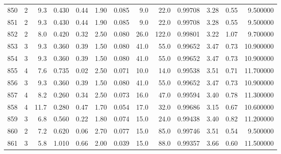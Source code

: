 \begin{tabular}{lrrrrrrrrrrrr}
850  &        2 &            9.3 &             0.430 &         0.44 &            1.90 &      0.085 &                  9.0 &                  22.0 &  0.99708 &  3.28 &       0.55 &   9.500000 \\
851  &        2 &            9.3 &             0.430 &         0.44 &            1.90 &      0.085 &                  9.0 &                  22.0 &  0.99708 &  3.28 &       0.55 &   9.500000 \\
852  &        2 &            8.0 &             0.420 &         0.32 &            2.50 &      0.080 &                 26.0 &                 122.0 &  0.99801 &  3.22 &       1.07 &   9.700000 \\
853  &        3 &            9.3 &             0.360 &         0.39 &            1.50 &      0.080 &                 41.0 &                  55.0 &  0.99652 &  3.47 &       0.73 &  10.900000 \\
854  &        3 &            9.3 &             0.360 &         0.39 &            1.50 &      0.080 &                 41.0 &                  55.0 &  0.99652 &  3.47 &       0.73 &  10.900000 \\
855  &        4 &            7.6 &             0.735 &         0.02 &            2.50 &      0.071 &                 10.0 &                  14.0 &  0.99538 &  3.51 &       0.71 &  11.700000 \\
856  &        3 &            9.3 &             0.360 &         0.39 &            1.50 &      0.080 &                 41.0 &                  55.0 &  0.99652 &  3.47 &       0.73 &  10.900000 \\
857  &        4 &            8.2 &             0.260 &         0.34 &            2.50 &      0.073 &                 16.0 &                  47.0 &  0.99594 &  3.40 &       0.78 &  11.300000 \\
858  &        4 &           11.7 &             0.280 &         0.47 &            1.70 &      0.054 &                 17.0 &                  32.0 &  0.99686 &  3.15 &       0.67 &  10.600000 \\
859  &        3 &            6.8 &             0.560 &         0.22 &            1.80 &      0.074 &                 15.0 &                  24.0 &  0.99438 &  3.40 &       0.82 &  11.200000 \\
860  &        2 &            7.2 &             0.620 &         0.06 &            2.70 &      0.077 &                 15.0 &                  85.0 &  0.99746 &  3.51 &       0.54 &   9.500000 \\
861  &        3 &            5.8 &             1.010 &         0.66 &            2.00 &      0.039 &                 15.0 &                  88.0 &  0.99357 &  3.66 &       0.60 &  11.500000 \\

\end{tabular}
